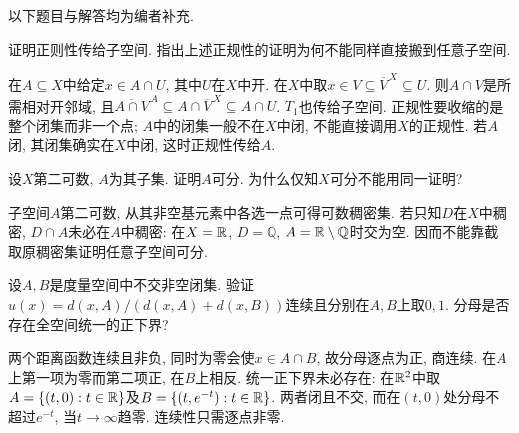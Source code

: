 以下题目与解答均为编者补充.
\begin{exercise}
证明正则性传给子空间. 指出上述正规性的证明为何不能同样直接搬到任意子空间.
\end{exercise}
\begin{solution}
在$A\subseteq X$中给定$x\in A\cap U$, 其中$U$在$X$中开. 在$X$中取$x\in V\subseteq\overline V^{\,X}\subseteq U$. 则$A\cap V$是所需相对开邻域, 且$\overline{A\cap V}^{\,A}\subseteq A\cap\overline V^{\,X}\subseteq A\cap U$. $T_1$也传给子空间. 正规性要收缩的是整个闭集而非一个点; $A$中的闭集一般不在$X$中闭, 不能直接调用$X$的正规性. 若$A$闭, 其闭集确实在$X$中闭, 这时正规性传给$A$.
\end{solution}
\begin{exercise}
设$X$第二可数, $A$为其子集. 证明$A$可分. 为什么仅知$X$可分不能用同一证明?
\end{exercise}
\begin{solution}
子空间$A$第二可数, 从其非空基元素中各选一点可得可数稠密集. 若只知$D$在$X$中稠密, $D\cap A$未必在$A$中稠密: 在$X=\mathbb R$, $D=\mathbb Q$, $A=\mathbb R\setminus\mathbb Q$时交为空. 因而不能靠截取原稠密集证明任意子空间可分.
\end{solution}
\begin{exercise}
设$A,B$是度量空间中不交非空闭集. 验证$u(x)=d(x,A)/(d(x,A)+d(x,B))$连续且分别在$A,B$上取$0,1$. 分母是否存在全空间统一的正下界?
\end{exercise}
\begin{solution}
两个距离函数连续且非负, 同时为零会使$x\in A\cap B$, 故分母逐点为正, 商连续. 在$A$上第一项为零而第二项正, 在$B$上相反. 统一正下界未必存在: 在$\mathbb R^2$中取$A=\{(t,0):t\in\mathbb R\}$及$B=\{(t,e^{-t}):t\in\mathbb R\}$. 两者闭且不交, 而在$(t,0)$处分母不超过$e^{-t}$, 当$t\to\infty$趋零. 连续性只需逐点非零.
\end{solution}
